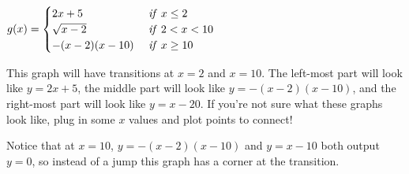 \documentclass{ximera}
\begin{document}
\begin{example}
$g(x)=\begin{cases} 2x+5 & \mbox{ \emph{if} }x\leq 2\\ \sqrt{x-2} & \mbox{ \emph{if} } 2<x<10\\ -(x-2)(x-10) & \mbox{ \emph{if} } x\geq 10\end{cases}$

This graph will have transitions at $x=2$ and $x=10$. The left-most part will look like $y=2x+5$, the middle part will look like $y=-(x-2)(x-10)$, and the right-most part will look like $y=x-20$. If you're not sure what these graphs look like, plug in some $x$ values and plot points to connect!


Notice that at $x=10$, $y=-(x-2)(x-10)$ and $y=x-10$ both output $y=0$, so instead of a jump this graph has a corner at the transition.
\end{example}
\end{document}

